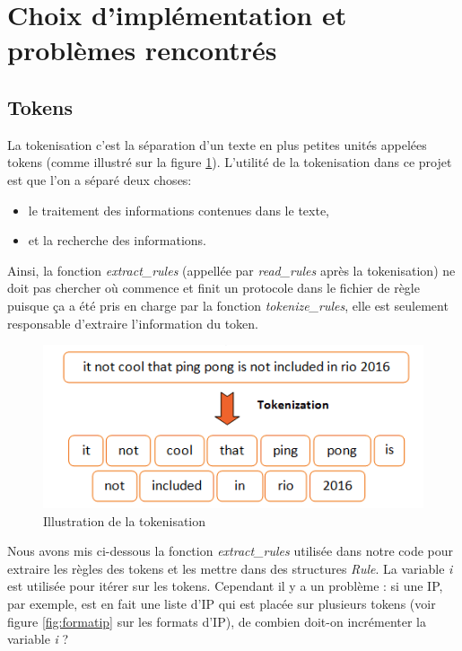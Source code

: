 \documentclass[a4paper]{article}
\begin{document}
\section{Choix d'implémentation et problèmes rencontrés} \label{sec:implspec}





\subsection{Tokens} \label{subsec:tokens}



La tokenisation c'est la séparation d'un texte en plus petites unités appelées tokens (comme illustré sur la figure \ref{fig:tokenization}). L'utilité de la tokenisation dans ce projet est que l'on a séparé deux choses:
\begin{itemize}
    \item le traitement des informations contenues dans le texte,
    \item et la recherche des informations.
\end{itemize}
Ainsi, la fonction \textit{extract\_rules} (appellée par \textit{read\_rules} après la tokenisation) ne doit pas chercher où commence et finit un protocole dans le fichier de règle puisque ça a été pris en charge par la fonction \textit{tokenize\_rules}, elle est seulement responsable d'extraire l'information du token.

\begin{figure}[H]
    \centering
    \includegraphics[width=0.65\linewidth]{images/tokenization.png}
    \caption{Illustration de la tokenisation \cite{6}}
    \label{fig:tokenization}
\end{figure}

Nous avons mis ci-dessous la fonction \textit{extract\_rules} utilisée dans notre code pour extraire les règles des tokens et les mettre dans des structures \textit{Rule}. La variable \textit{i} est utilisée pour itérer sur les tokens. Cependant il y a un problème : si une IP, par exemple, est en fait une liste d'IP qui est placée sur plusieurs tokens (voir figure \ref{fig:formatip} sur les formats d'IP), de combien doit-on incrémenter la variable \textit{i} ?
\end{document}
